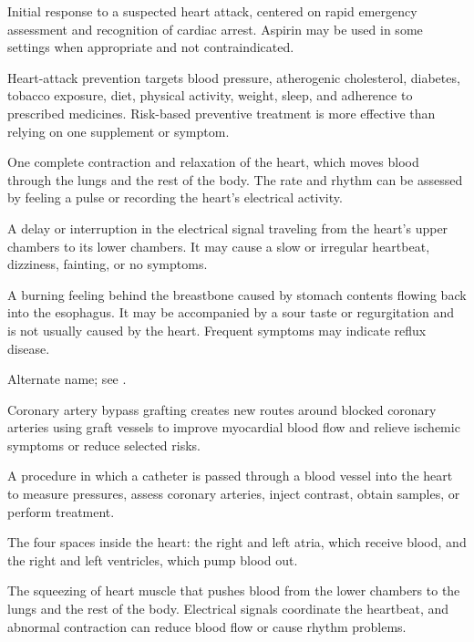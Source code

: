  Initial response to a suspected heart attack, centered on rapid emergency assessment and recognition of cardiac arrest. Aspirin may be used in some settings when appropriate and not contraindicated.

 Heart-attack prevention targets blood pressure, atherogenic cholesterol, diabetes, tobacco exposure, diet, physical activity, weight, sleep, and adherence to prescribed medicines. Risk-based preventive treatment is more effective than relying on one supplement or symptom.

 One complete contraction and relaxation of the heart, which moves blood through the lungs and the rest of the body. The rate and rhythm can be assessed by feeling a pulse or recording the heart's electrical activity.

 A delay or interruption in the electrical signal traveling from the heart’s upper chambers to its lower chambers. It may cause a slow or irregular heartbeat, dizziness, fainting, or no symptoms.

 A burning feeling behind the breastbone caused by stomach contents flowing back into the esophagus. It may be accompanied by a sour taste or regurgitation and is not usually caused by the heart. Frequent symptoms may indicate reflux disease.

 Alternate name; see .

 Coronary artery bypass grafting creates new routes around blocked coronary arteries using graft vessels to improve myocardial blood flow and relieve ischemic symptoms or reduce selected risks.

 A procedure in which a catheter is passed through a blood vessel into the heart to measure pressures, assess coronary arteries, inject contrast, obtain samples, or perform treatment.

 The four spaces inside the heart: the right and left atria, which receive blood, and the right and left ventricles, which pump blood out.

 The squeezing of heart muscle that pushes blood from the lower chambers to the lungs and the rest of the body. Electrical signals coordinate the heartbeat, and abnormal contraction can reduce blood flow or cause rhythm problems.

